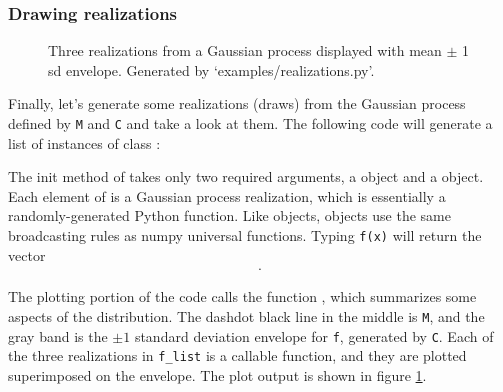 \documentclass{manual}
\begin{document}
\subsubsection{Drawing realizations}\label{subsub:realizations}
\begin{figure}
    \centering
    \caption{Three realizations from a Gaussian process displayed with mean $\pm$ 1 sd envelope. Generated by {\sffamily `examples/realizations.py'}.}
    \label{fig:realizations}
\end{figure}

Finally, let's generate some realizations (draws) from the Gaussian process defined by \texttt{M} and \texttt{C} and take a look at them. The following code will generate a list of instances of class :


    The init method of  takes only two required arguments, a  object and a  object. Each element of  is a Gaussian process realization, which is essentially a randomly-generated Python function. Like  objects,  objects use the same broadcasting rules as numpy universal functions. Typing \texttt{f(x)} will return the vector 
\begin{eqnarray*}
    [\texttt{f(x[0])}\ldots \texttt{f(x[N-1])}].
\end{eqnarray*}
    

The plotting portion of the code calls the function , which summarizes some aspects of the distribution. The dashdot black line in the middle is \texttt{M}, and the gray band is the $\pm 1$ standard deviation envelope for \texttt{f}, generated by \texttt{C}. Each of the three realizations in \texttt{f_list} is a callable function, and they are plotted superimposed on the envelope. The plot output is shown in figure \ref{fig:realizations}. 
\end{document}
